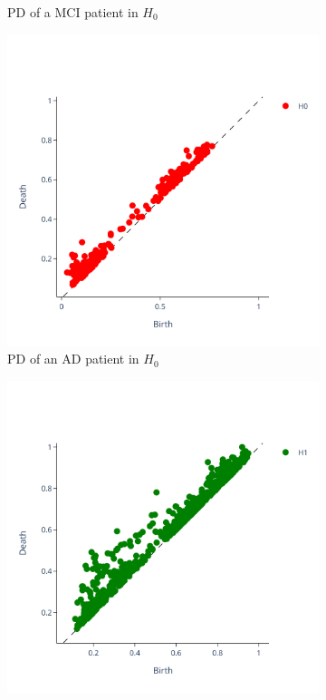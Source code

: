 \documentclass{article}
\begin{document}
\begin{figure}[htb]
\begin{subfigure}{0.32\textwidth}
    \caption{PD of a MCI patient in $H_0$}
  \end{subfigure}
  \begin{subfigure}{0.32\textwidth}
    \includegraphics[width=\textwidth]{figures/PDs/persistence_diagram_AD_H_0.png}
    \caption{PD of an AD patient in $H_0$}
  \end{subfigure}
  \begin{subfigure}{0.32\textwidth}
    \includegraphics[width=\textwidth]{figures/PDs/persistence_diagram_CN_H_1.png}

\end{subfigure}
\end{figure}
\end{document}
